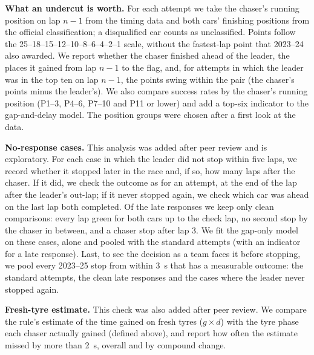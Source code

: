 \documentclass[12pt]{article}
\begin{document}
\textbf{What an undercut is worth.} For each attempt we take the chaser's running position on lap $n-1$ from the timing data and both cars' finishing positions from the official classification; a disqualified car counts as unclassified. Points follow the 25--18--15--12--10--8--6--4--2--1 scale, without the fastest-lap point that 2023--24 also awarded. We report whether the chaser finished ahead of the leader, the places it gained from lap $n-1$ to the flag, and, for attempts in which the leader was in the top ten on lap $n-1$, the points swing within the pair (the chaser's points minus the leader's). We also compare success rates by the chaser's running position (P1--3, P4--6, P7--10 and P11 or lower) and add a top-six indicator to the gap-and-delay model. The position groups were chosen after a first look at the data.

\textbf{No-response cases.} This analysis was added after peer review and is exploratory. For each case in which the leader did not stop within five laps, we record whether it stopped later in the race and, if so, how many laps after the chaser. If it did, we check the outcome as for an attempt, at the end of the lap after the leader's out-lap; if it never stopped again, we check which car was ahead on the last lap both completed. Of the late responses we keep only clean comparisons: every lap green for both cars up to the check lap, no second stop by the chaser in between, and a chaser stop after lap 3. We fit the gap-only model on these cases, alone and pooled with the standard attempts (with an indicator for a late response). Last, to see the decision as a team faces it before stopping, we pool every 2023--25 stop from within 3~s that has a measurable outcome: the standard attempts, the clean late responses and the cases where the leader never stopped again.

\textbf{Fresh-tyre estimate.} This check was also added after peer review. We compare the rule's estimate of the time gained on fresh tyres ($g \times d$) with the tyre phase each chaser actually gained (defined above), and report how often the estimate missed by more than 2~s, overall and by compound change.
\end{document}
